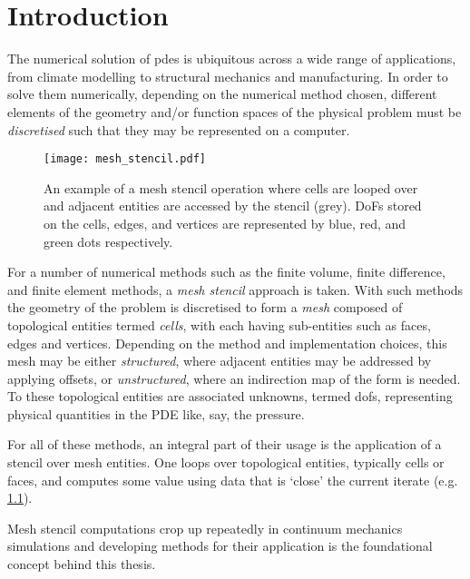 \documentclass[thesis]{subfiles}
\begin{document}
\chapter{Introduction}
\label{chapter:introduction}

The numerical solution of \glspl{pde} is ubiquitous across a wide range of applications, from climate modelling to structural mechanics and manufacturing.
In order to solve them numerically, depending on the numerical method chosen, different elements of the geometry and/or function spaces of the physical problem must be \textit{discretised} such that they may be represented on a computer.


\begin{figure}
  \centering
  \texttt{[image: mesh\_stencil.pdf]}
  \caption{
    An example of a mesh stencil operation where cells are looped over and adjacent entities are accessed by the stencil (grey).
    DoFs stored on the cells, edges, and vertices are represented by blue, red, and green dots respectively.
  }
  \label{fig:mesh_stencil}
\end{figure}

For a number of numerical methods such as the finite volume, finite difference, and finite element methods, a \textit{mesh stencil} approach is taken.
With such methods the geometry of the problem is discretised to form a \textit{mesh} composed of topological entities termed \textit{cells}, with each having sub-entities such as faces, edges and vertices.
Depending on the method and implementation choices, this mesh may be either \textit{structured}, where adjacent entities may be addressed by applying offsets, or \textit{unstructured}, where an indirection map of the form  is needed.
To these topological entities are associated unknowns, termed \glspl{dof}, representing physical quantities in the PDE like, say, the pressure.

For all of these methods, an integral part of their usage is the application of a stencil over mesh entities.
One loops over topological entities, typically cells or faces, and computes some value using data that is `close' the current iterate (e.g. \cref{fig:mesh_stencil}).

Mesh stencil computations crop up repeatedly in continuum mechanics simulations and developing methods for their application is the foundational concept behind this thesis.
\end{document}
